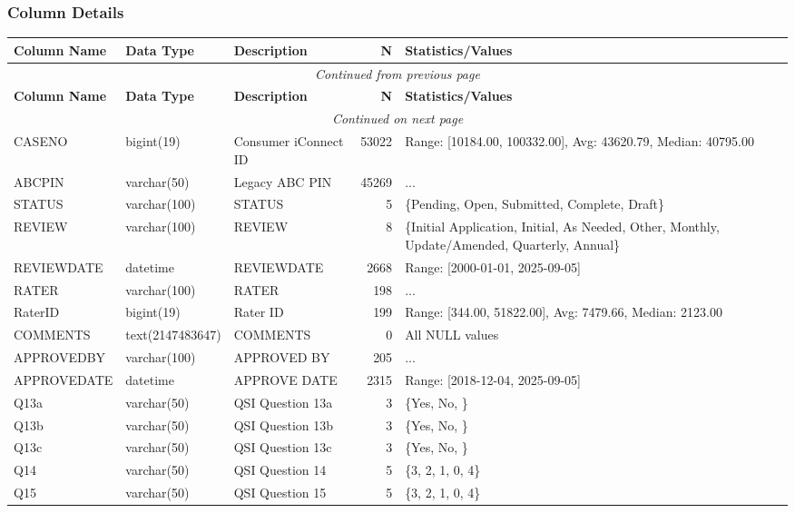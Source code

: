 \begin{landscape}
\subsubsection{Column Details}
\begin{longtable}{|l|l|l|r|p{6cm}|}
\hline
\textbf{Column Name} & \textbf{Data Type} & \textbf{Description} & \textbf{N} & \textbf{Statistics/Values} \\
\hline
\endfirsthead
\multicolumn{5}{c}{\textit{Continued from previous page}} \\
\hline
\textbf{Column Name} & \textbf{Data Type} & \textbf{Description} & \textbf{N} & \textbf{Statistics/Values} \\
\hline
\endhead
\hline
\multicolumn{5}{c}{\textit{Continued on next page}} \\
\endfoot
\hline
\endlastfoot
CASENO & bigint(19) & Consumer iConnect ID & 53022 & Range: [10184.00, 100332.00], Avg: 43620.79, Median: 40795.00 \\
\hline
ABCPIN & varchar(50) & Legacy ABC PIN & 45269 & ... \\
\hline
STATUS & varchar(100) & STATUS & 5 & \{Pending, Open, Submitted, Complete, Draft\} \\
\hline
REVIEW & varchar(100) & REVIEW & 8 & \{Initial Application, Initial, As Needed, Other, Monthly, Update/Amended, Quarterly, Annual\} \\
\hline
REVIEWDATE & datetime & REVIEWDATE & 2668 & Range: [2000-01-01, 2025-09-05] \\
\hline
RATER & varchar(100) & RATER & 198 & ... \\
\hline
RaterID & bigint(19) & Rater ID & 199 & Range: [344.00, 51822.00], Avg: 7479.66, Median: 2123.00 \\
\hline
COMMENTS & text(2147483647) & COMMENTS & 0 & All NULL values \\
\hline
APPROVEDBY & varchar(100) & APPROVED BY & 205 & ... \\
\hline
APPROVEDATE & datetime & APPROVE DATE & 2315 & Range: [2018-12-04, 2025-09-05] \\
\hline
Q13a & varchar(50) & QSI Question 13a & 3 & \{Yes, No, \} \\
\hline
Q13b & varchar(50) & QSI Question 13b & 3 & \{Yes, No, \} \\
\hline
Q13c & varchar(50) & QSI Question 13c & 3 & \{Yes, No, \} \\
\hline
Q14 & varchar(50) & QSI Question 14 & 5 & \{3, 2, 1, 0, 4\} \\
\hline
Q15 & varchar(50) & QSI Question 15 & 5 & \{3, 2, 1, 0, 4\} \\

\end{longtable}
\end{landscape}
